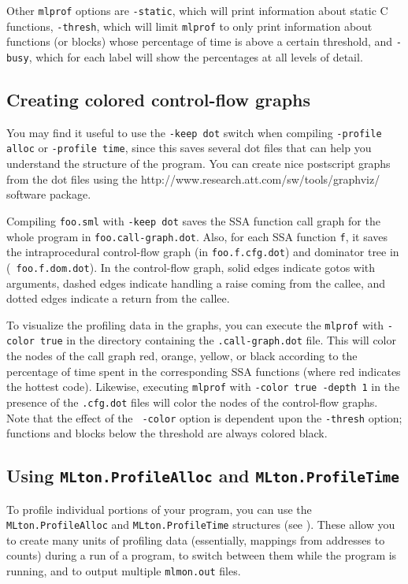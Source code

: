 Other {\tt mlprof} options are {\tt -static}, which will print
information about static C functions, {\tt -thresh}, which will limit
{\tt mlprof} to only print information about functions (or blocks)
whose percentage of time is above a certain threshold, and {\tt -busy},
which for each label will show the percentages at all levels of
detail.

\subsection{Creating colored control-flow graphs}

You may find it useful to use the {\tt -keep dot} switch when
compiling {\tt -profile alloc} or {\tt -profile time}, since this
saves several dot files that can help you understand the structure of
the program.  You can create nice postscript graphs from the dot files
using the
		  {http://www.research.att.com/sw/tools/graphviz/}
software package.

Compiling {\tt foo.sml} with {\tt -keep dot} saves the SSA function
call graph for the whole program in {\tt foo.call-graph.dot}.  Also,
for each SSA function {\tt f}, it saves the intraprocedural
control-flow graph (in {\tt foo.f.cfg.dot}) and dominator tree in ({\tt
foo.f.dom.dot}).  In the control-flow graph, solid edges indicate
gotos with arguments, dashed edges indicate handling a raise coming
from the callee, and dotted edges indicate a return from the callee.

To visualize the profiling data in the graphs, you can execute the
{\tt mlprof} with {\tt -color true} in the directory containing the
{\tt .call-graph.dot} file.  This will color the nodes of the call
graph red, orange, yellow, or black according to the percentage of
time spent in the corresponding SSA functions (where red indicates the
hottest code).  Likewise, executing {\tt mlprof} with {\tt -color true
-depth 1} in the presence of the {\tt .cfg.dot} files will color the
nodes of the control-flow graphs.  Note that the effect of the {\tt
-color} option is dependent upon the {\tt -thresh} option; functions
and blocks below the threshold are always colored black.

\subsection{Using {\tt MLton.ProfileAlloc} and {\tt MLton.ProfileTime}}

To profile individual portions of your program, you can use the {\tt
MLton.ProfileAlloc} and {\tt MLton.ProfileTime} structures (see
).  These allow you to create many units of
profiling data (essentially, mappings from addresses to counts) during
a run of a program, to switch between them while the program is
running, and to output multiple {\tt mlmon.out} files.

